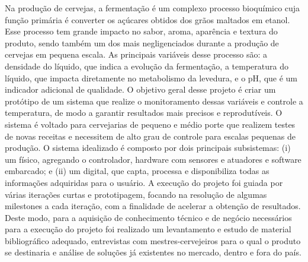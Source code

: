 Na produção de cervejas, a fermentação é um complexo processo bioquímico cuja função primária é converter os açúcares obtidos dos grãos maltados em etanol. Esse processo tem grande impacto no sabor, aroma, aparência e textura do produto, sendo também um dos mais negligenciados durante a produção de cervejas em pequena escala. 
As principais variáveis desse processo são: a densidade do líquido, que indica a evolução da fermentação, a temperatura do líquido, que impacta diretamente no metabolismo da levedura, e o pH, que é um indicador adicional de qualidade. 
O objetivo geral desse projeto é criar um protótipo de um sistema que realize o monitoramento dessas variáveis e controle a temperatura, de modo a garantir resultados mais precisos e reprodutíveis. O sistema é voltado para cervejarias de pequeno e médio porte que realizem testes de novas receitas e necessitem de alto grau de controle para escalas pequenas de produção. 
O sistema idealizado é composto por dois principais subsistemas: (i) um físico, agregando o controlador, hardware com sensores e atuadores e software embarcado; e (ii) um digital, que capta, processa e disponibiliza todas as informações adquiridas para o usuário. A execução do projeto foi guiada por várias iterações curtas e prototipagem, focando na resolução de algumas milestones a cada iteração, com a finalidade de acelerar a obtenção de resultados.
Deste modo, para a aquisição de conhecimento técnico e de negócio necessários para a execução do projeto foi realizado um levantamento e estudo de material bibliográfico adequado, entrevistas com mestres-cervejeiros para o qual o produto se destinaria e análise de soluções já existentes no mercado, dentro e fora do país.
